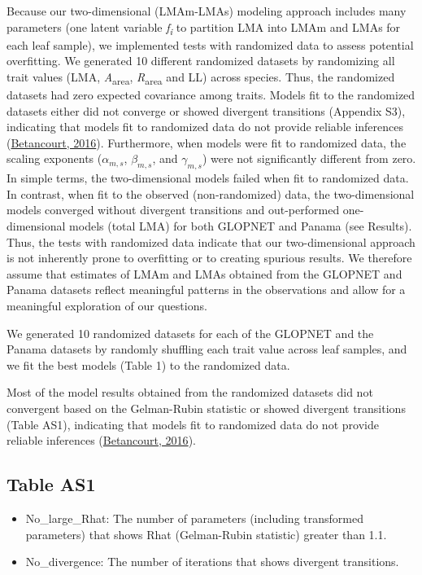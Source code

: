 \documentclass[
  12pt,
  letterpaper,
  DIV=11,
  numbers=noendperiod]{scrartcl}
\begin{document}
Because our two-dimensional (LMAm-LMAs) modeling approach includes many
parameters (one latent variable \emph{f\textsubscript{i}} to partition
LMA into LMAm and LMAs for each leaf sample), we implemented tests with
randomized data to assess potential overfitting. We generated 10
different randomized datasets by randomizing all trait values (LMA,
\emph{A}\textsubscript{area}, \emph{R}\textsubscript{area} and LL)
across species. Thus, the randomized datasets had zero expected
covariance among traits. Models fit to the randomized datasets either
did not converge or showed divergent transitions (Appendix S3),
indicating that models fit to randomized data do not provide reliable
inferences (\protect\hyperlink{ref-Betancourt2016}{Betancourt, 2016}).
Furthermore, when models were fit to randomized data, the scaling
exponents (\(\alpha_{m,s}\), \(\beta_{m,s}\), and \(\gamma_{m,s}\)) were
not significantly different from zero. In simple terms, the
two-dimensional models failed when fit to randomized data. In contrast,
when fit to the observed (non-randomized) data, the two-dimensional
models converged without divergent transitions and out-performed
one-dimensional models (total LMA) for both GLOPNET and Panama (see
Results). Thus, the tests with randomized data indicate that our
two-dimensional approach is not inherently prone to overfitting or to
creating spurious results. We therefore assume that estimates of LMAm
and LMAs obtained from the GLOPNET and Panama datasets reflect
meaningful patterns in the observations and allow for a meaningful
exploration of our questions.

We generated 10 randomized datasets for each of the GLOPNET and the
Panama datasets by randomly shuffling each trait value across leaf
samples, and we fit the best models (Table 1) to the randomized data.

Most of the model results obtained from the randomized datasets did not
convergent based on the Gelman-Rubin statistic or showed divergent
transitions (Table AS1), indicating that models fit to randomized data
do not provide reliable inferences
(\protect\hyperlink{ref-Betancourt2016}{Betancourt, 2016}).

\hypertarget{table-as1}{%
\subsection{Table AS1}\label{table-as1}}

\begin{itemize}
\item
  No\_large\_Rhat: The number of parameters (including transformed
  parameters) that shows Rhat (Gelman-Rubin statistic) greater than 1.1.
\item
  No\_divergence: The number of iterations that shows divergent
  transitions.
\end{itemize}
\end{document}
